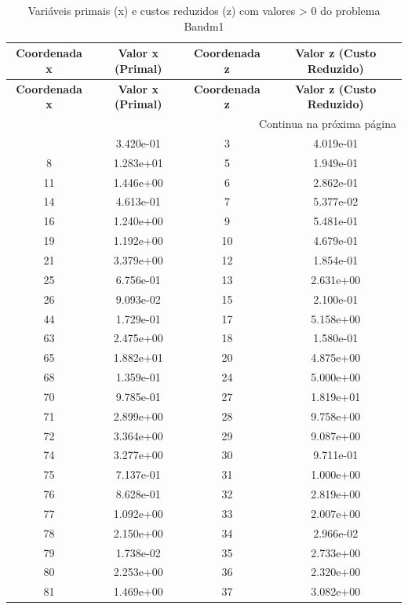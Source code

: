 \documentclass[12pt]{article}
\begin{document}
\begin{longtable}{@{}cccc@{}}
\caption{Variáveis primais (x) e custos reduzidos (z) com valores > 0 do problema Bandm1} \\
\toprule
\textbf{Coordenada x} & \textbf{Valor x (Primal)} & \textbf{Coordenada z} & \textbf{Valor z (Custo Reduzido)} \\
\midrule
\endfirsthead

\toprule
\textbf{Coordenada x} & \textbf{Valor x (Primal)} & \textbf{Coordenada z} & \textbf{Valor z (Custo Reduzido)} \\
\midrule
\endhead

\midrule \multicolumn{4}{r}{{Continua na próxima página}} \\ \midrule
\endfoot

\bottomrule
\endlastfoot
4 & 3.420e-01 & 3 & 4.019e-01 \\
8 & 1.283e+01 & 5 & 1.949e-01 \\
11 & 1.446e+00 & 6 & 2.862e-01 \\
14 & 4.613e-01 & 7 & 5.377e-02 \\
16 & 1.240e+00 & 9 & 5.481e-01 \\
19 & 1.192e+00 & 10 & 4.679e-01 \\
21 & 3.379e+00 & 12 & 1.854e-01 \\
25 & 6.756e-01 & 13 & 2.631e+00 \\
26 & 9.093e-02 & 15 & 2.100e-01 \\
44 & 1.729e-01 & 17 & 5.158e+00 \\
63 & 2.475e+00 & 18 & 1.580e-01 \\
65 & 1.882e+01 & 20 & 4.875e+00 \\
68 & 1.359e-01 & 24 & 5.000e+00 \\
70 & 9.785e-01 & 27 & 1.819e+01 \\
71 & 2.899e+00 & 28 & 9.758e+00 \\
72 & 3.364e+00 & 29 & 9.087e+00 \\
74 & 3.277e+00 & 30 & 9.711e-01 \\
75 & 7.137e-01 & 31 & 1.000e+00 \\
76 & 8.628e-01 & 32 & 2.819e+00 \\
77 & 1.092e+00 & 33 & 2.007e+00 \\
78 & 2.150e+00 & 34 & 2.966e-02 \\
79 & 1.738e-02 & 35 & 2.733e+00 \\
80 & 2.253e+00 & 36 & 2.320e+00 \\
81 & 1.469e+00 & 37 & 3.082e+00 \\

\end{longtable}
\end{document}
